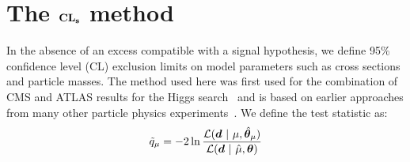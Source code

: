 \chapter{The $\mathbf{\text{{\bf CL}}_s}$ method}

In the absence of an excess compatible with a signal hypothesis, we define 95\% confidence level (CL) exclusion limits on model parameters such as cross sections and particle masses.
The method used here was first used for the combination of CMS and ATLAS results for the Higgs search~\cite{cls1} and is based on earlier approaches from many other particle physics experiments~\cite{cls2,cls3}.
We define the test statistic as:
\begin{equation}
    \tilde q_\mu = -2\ln \frac{\mathcal{L}(\bm{d} ~|~ \mu,\hat{\bm{\theta}}_\mu)}{\mathcal{L}(\bm{d} ~|~ \hat\mu,\bm{\theta})}
\end{equation}

